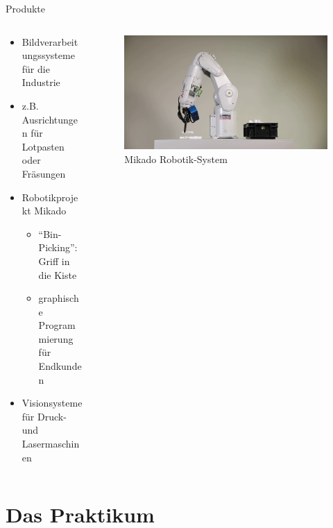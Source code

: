 \documentclass[xcolor=dvipsnames]{beamer}
\begin{document}
\begin{frame}{Produkte}
\begin{columns}
\begin{column}{0.6\textwidth}
\begin{itemize}
\item Bildverarbeitungssysteme für die Industrie
\item z.B. Ausrichtungen für Lotpasten oder Fräsungen
\item Robotikprojekt Mikado
\begin{itemize}
\item ``Bin-Picking'': Griff in die Kiste
\item graphische Programmierung für Endkunden
\end{itemize}
\item Visionsysteme für Druck- und Lasermaschinen
\end{itemize}
\end{column}
\begin{column}{0.4\textwidth}
\begin{figure}[t]
\includegraphics[width=\textwidth]{media/mikado-roboter.jpg}
\caption{Mikado Robotik-System}
\end{figure}
\end{column}
\end{columns}
\end{frame}


\section{Das Praktikum}
\end{document}
